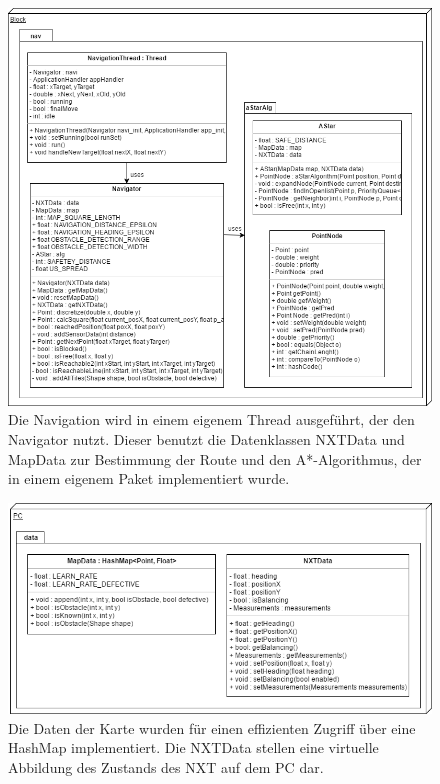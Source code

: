 \documentclass[oneside,abstractoff,a4paper]{scrartcl}
\begin{document}
\begin{figure}
	\includegraphics[width=\textwidth]{nav.png}
    \caption{Die Navigation wird in einem eigenem Thread ausgeführt, der den Navigator nutzt. Dieser benutzt die Datenklassen NXTData und MapData zur Bestimmung der Route und den A*-Algorithmus, der in einem eigenem Paket implementiert wurde.}
    \label{fig:nav}
\end{figure}

\begin{figure}
	\includegraphics[width=\textwidth]{data.png}
    \caption{Die Daten der Karte wurden für einen effizienten Zugriff über eine HashMap implementiert. Die NXTData stellen eine virtuelle Abbildung des Zustands des NXT auf dem PC dar.}
    \label{fig:data}
\end{figure}
\end{document}
